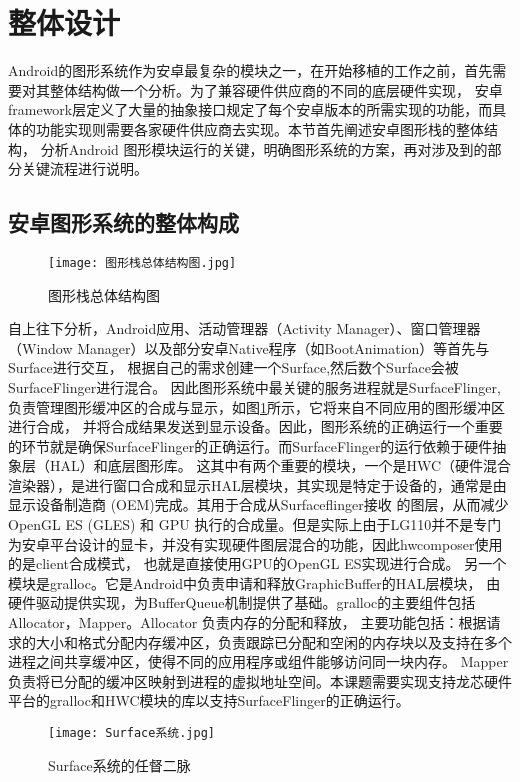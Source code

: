 
\section{整体设计}
Android的图形系统作为安卓最复杂的模块之一，在开始移植的工作之前，首先需要对其整体结构做一个分析。为了兼容硬件供应商的不同的底层硬件实现，
安卓framework层定义了大量的抽象接口规定了每个安卓版本的所需实现的功能，而具体的功能实现则需要各家硬件供应商去实现。本节首先阐述安卓图形栈的整体结构，
分析Android 图形模块运行的关键，明确图形系统的方案，再对涉及到的部分关键流程进行说明。
\subsection{安卓图形系统的整体构成}
\begin{figure}[h]
  \centering
  \texttt{[image: 图形栈总体结构图.jpg]}
  \caption{图形栈总体结构图}    
  \label{fig:图形栈总体结构图}
\end{figure}
自上往下分析，Android应用、活动管理器（Activity Manager）、窗口管理器（Window Manager）以及部分安卓Native程序（如BootAnimation）等首先与Surface进行交互，
根据自己的需求创建一个Surface,然后数个Surface会被SurfaceFlinger进行混合\cite{邓凡平2011深入理解}。
因此图形系统中最关键的服务进程就是SurfaceFlinger,负责管理图形缓冲区的合成与显示，如图\ref{fig:图形栈总体结构图}所示，它将来自不同应用的图形缓冲区进行合成，
并将合成结果发送到显示设备。因此，图形系统的正确运行一个重要的环节就是确保SurfaceFlinger的正确运行。而SurfaceFlinger的运行依赖于硬件抽象层（HAL）和底层图形库。
这其中有两个重要的模块，一个是HWC（硬件混合渲染器），是进行窗口合成和显示HAL层模块，其实现是特定于设备的，通常是由显示设备制造商 (OEM)完成。其用于合成从Surfaceflinger接收
的图层，从而减少OpenGL ES (GLES) 和 GPU 执行的合成量。但是实际上由于LG110并不是专门为安卓平台设计的显卡，并没有实现硬件图层混合的功能，因此hwcomposer使用的是client合成模式，
也就是直接使用GPU的OpenGL ES实现进行合成。
另一个模块是gralloc。它是Android中负责申请和释放GraphicBuffer的HAL层模块，
由硬件驱动提供实现，为BufferQueue机制提供了基础。gralloc的主要组件包括Allocator，Mapper。Allocator 负责内存的分配和释放，
主要功能包括：根据请求的大小和格式分配内存缓冲区，负责跟踪已分配和空闲的内存块以及支持在多个进程之间共享缓冲区，使得不同的应用程序或组件能够访问同一块内存。
Mapper负责将已分配的缓冲区映射到进程的虚拟地址空间。本课题需要实现支持龙芯硬件平台的gralloc和HWC模块的库以支持SurfaceFlinger的正确运行。
\begin{figure}[h]
  \centering
  \texttt{[image: Surface系统.jpg]}
  \caption{Surface系统的任督二脉}    
  \label{fig:Surface系统的任督二脉}
  \cite{邓凡平2011深入理解}
\end{figure}

